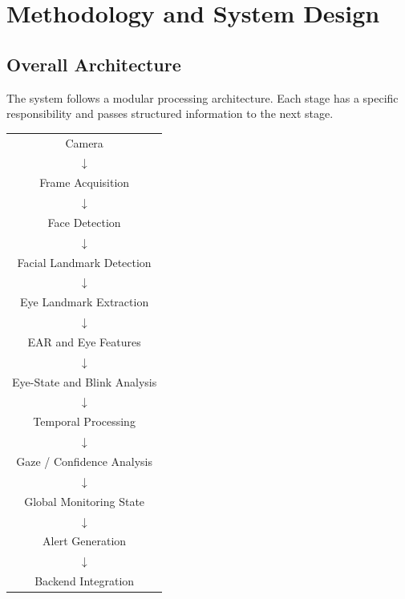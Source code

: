 \documentclass{tietreport}
\begin{document}

\chapter{Methodology and System Design}

\section{Overall Architecture}

The system follows a modular processing architecture. Each stage has
a specific responsibility and passes structured information to the next
stage.

\begin{center}

\begin{tabular}{c}

Camera\\
$\downarrow$\\
Frame Acquisition\\
$\downarrow$\\
Face Detection\\
$\downarrow$\\
Facial Landmark Detection\\
$\downarrow$\\
Eye Landmark Extraction\\
$\downarrow$\\
EAR and Eye Features\\
$\downarrow$\\
Eye-State and Blink Analysis\\
$\downarrow$\\
Temporal Processing\\
$\downarrow$\\
Gaze / Confidence Analysis\\
$\downarrow$\\
Global Monitoring State\\
$\downarrow$\\
Alert Generation\\
$\downarrow$\\
Backend Integration

\end{tabular}

\end{center}

\end{document}
